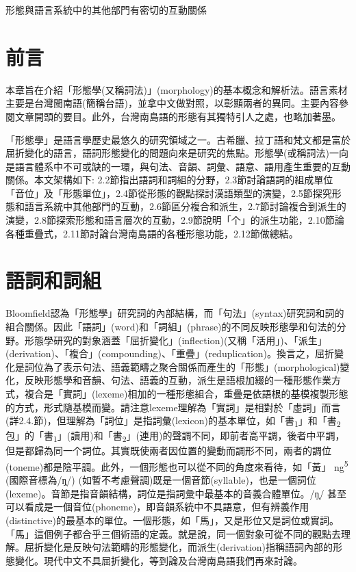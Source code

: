 \rmfamily
形態與語言系統中的其他部門有密切的互動關係

\section{\rmfamily 前言}

\textrm{本章旨在介紹「形態學(又稱詞法)」(morphology)的基本概念和解析法}。\textrm{語言素材主要是台灣閩南語(簡稱台語)}，\textrm{並拿中文做對照，以彰顯兩者的異同}。\textrm{主要內容參閱文章開頭的要目}。\textrm{此外}，\textrm{台灣南島語的形態有其獨特引人之處}，\textrm{也略加著墨。}

\textrm{「形態學」是語言學歷史最悠久的研究領域之一。古希臘、拉丁語和梵文都是富於屈折變化的語言，語詞形態變化的問題向來是研究的焦點。形態學(或稱詞法)一向是語言體系中不可或缺的一環，與句法、音韻、詞彙、語意、語用產生重要的互動關係。本文架構如下: 2.2節指出語詞和詞組的分野，2.3節討論語詞的組成單位「音位」及「形態單位」，2.4節從形態的觀點探討漢語類型的演變，2.5節探究形態和語言系統中其他部門的互動，2.6節區分複合和派生，2.7節討論複合到派生的演變，2.8節探索形態和語言層次的互動，2.9節說明「个」的派生功能，2.10節論各種重疊式，2.11節討論台灣南島語的各種形態功能，2.12節做總結。}

\section{\rmfamily 語詞和詞組}

\textrm{Bloomfield認為「形態學」研究詞的內部結構，而「句法」(syntax)研究詞和詞的組合關係。因此「語詞」(word)和「詞組」(phrase)的不同反映形態學和句法的分野。形態學研究的對象涵蓋「屈折變化」(inflection)(又稱「活用」)、「派生」(derivation)、「複合」(compounding)、「重疊」(reduplication)。換言之，屈折變化是詞位為了表示句法、語義範疇之聚合關係而產生的「形態」(morphological)變化，反映形態學和音韻、句法、語義的互動，派生是語根加綴的一種形態作業方式，複合是「實詞」(lexeme)相加的一種形態組合，重疊是依語根的基模複製形態的方式，形式隨基模而變。請注意lexeme理解為「實詞」是相對於「虛詞」而言(詳2.4.節)，但理解為「詞位」是指詞彙(lexicon)的基本單位，如「書}\textrm{\textsubscript{1}}\textrm{」和「書}\textrm{\textsubscript{2}}\textrm{包」的「書}\textrm{\textsubscript{1}}\textrm{」(讀用)和「書}\textrm{\textsubscript{2}}\textrm{」(連用)的聲調不同，即前者高平調，後者中平調，但是都歸為同一个詞位。其實既使兩者因位置的變動而調形不同，兩者的調位(toneme)都是陰平調。此外，一個形態也可以從不同的角度來看待，如「黃」 ng}\textrm{\textsuperscript{5}} \textrm{(國際音標為/ŋ̩/) (如暫不考慮聲調)既是一個音節(syllable)，也是一個詞位(lexeme)}。\textrm{音節是指音韻結構}，\textrm{詞位是指詞彙中最基本的音義合體單位}。\textrm{/ŋ̩/ 甚至可以看成是一個音位(phoneme)}，\textrm{即音韻系統中不具語意}，\textrm{但有辨義作用(distinctive)的最基本的單位}。\textrm{一個形態，如「馬」}，\textrm{又是形位又是詞位或實詞}。\textrm{「馬」這個例子都合乎三個術語的定義}。\textrm{就是說}，\textrm{同一個對象可從不同的觀點去理解}。\textrm{屈折變化是反映句法範疇的形態變化}，\textrm{而派生(derivation)指稱語詞內部的形態變化}。\textrm{現代中文不具屈折變化}，\textrm{等到論及台灣南島語我們再來討論}。

